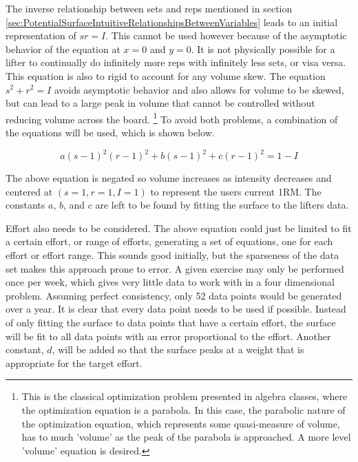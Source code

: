 The inverse relationship between sets and reps mentioned in section \ref{sec:PotentialSurfaceIntuitiveRelationshipsBetweenVariables} leads to an initial representation of $sr=I$. This cannot be used however because of the asymptotic behavior of the equation at $x=0$ and $y=0$. It is not physically possible for a lifter to continually do infinitely more reps with infinitely less sets, or visa versa. This equation is also to rigid to account for any volume skew. The equation $s^2+r^2=I$ avoids asymptotic behavior and also allows for volume to be skewed, but can lead to a large peak in volume that cannot be controlled without reducing volume across the board. \footnote{This is the classical optimization problem presented in algebra classes, where the optimization equation is a parabola. In this case, the parabolic nature of the optimization equation, which represents some quasi-measure of volume, has to much 'volume' as the peak of the parabola is approached. A more level 'volume' equation is desired.} To avoid both problems, a combination of the equations will be used, which is shown below.


\begin{equation*}
    a(s-1)^2(r-1)^2+b(s-1)^2+c(r-1)^2=1-I
\end{equation*}

The above equation is negated so volume increases as intensity decreases and centered at $(s=1,r=1,I=1)$ to represent the users current 1RM. The constants $a$, $b$, and $c$ are left to be found by fitting the surface to the lifters data.

Effort also needs to be considered. The above equation could just be limited to fit a certain effort, or range of efforts, generating a set of equations, one for each effort or effort range. This sounds good initially, but the sparseness of the data set makes this approach prone to error. A given exercise may only be performed once per week, which gives very little data to work with in a four dimensional problem. Assuming perfect consistency, only 52 data points would be generated over a year. It is clear that every data point needs to be used if possible. Instead of only fitting the surface to data points that have a certain effort, the surface will be fit to all data points with an error proportional to the effort. Another constant, $d$, will be added so that the surface peaks at a weight that is appropriate for the target effort.

